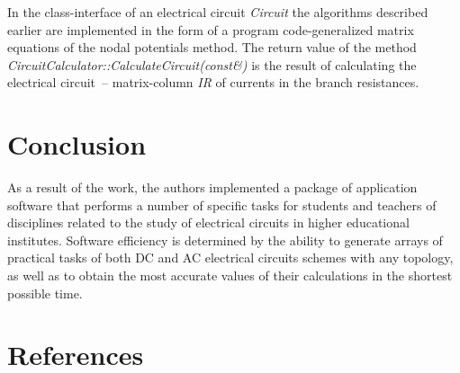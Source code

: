 \documentclass[a4paper,10pt,twoside]{article}
\begin{document}
\begin{multicols}{2}
In the class-interface of an electrical circuit \textit{Circuit} the algorithms described earlier are implemented in the form of a program code-generalized matrix equations of the nodal potentials method. The return value of the method \textit{CircuitCalculator::CalculateCircuit(const\&)} is the result of calculating the electrical circuit~-- matrix-column \textit{IR} of currents in the branch resistances.


\section*{Conclusion}
As a result of the work, the authors implemented a package of application software that performs a number of specific tasks for students and teachers of disciplines related to the study of electrical circuits in higher educational institutes. Software efficiency is determined by the ability to generate arrays of practical tasks of both DC and AC electrical circuits schemes with any topology, as well as to obtain the most accurate values of their calculations in the shortest possible time.

\section*{References}

\end{multicols}

\end{document}
